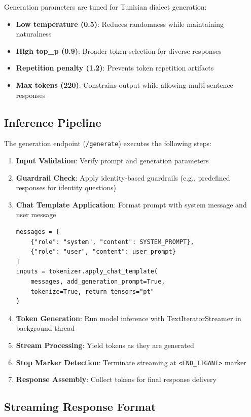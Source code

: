 \documentclass[12pt,a4paper]{report}
\begin{document}
Generation parameters are tuned for Tunisian dialect generation:
\begin{itemize}
    \item \textbf{Low temperature (0.5)}: Reduces randomness while maintaining naturalness
    \item \textbf{High top\_p (0.9)}: Broader token selection for diverse responses
    \item \textbf{Repetition penalty (1.2)}: Prevents token repetition artifacts
    \item \textbf{Max tokens (220)}: Constrains output while allowing multi-sentence responses
\end{itemize}

\subsection{Inference Pipeline}

The generation endpoint (\texttt{/generate}) executes the following steps:

\begin{enumerate}
    \item \textbf{Input Validation}: Verify prompt and generation parameters
    \item \textbf{Guardrail Check}: Apply identity-based guardrails (e.g., predefined responses for identity questions)
    \item \textbf{Chat Template Application}: Format prompt with system message and user message
    \begin{verbatim}
messages = [
    {"role": "system", "content": SYSTEM_PROMPT},
    {"role": "user", "content": user_prompt}
]
inputs = tokenizer.apply_chat_template(
    messages, add_generation_prompt=True, 
    tokenize=True, return_tensors="pt"
)
    \end{verbatim}
    \item \textbf{Token Generation}: Run model inference with TextIteratorStreamer in background thread
    \item \textbf{Stream Processing}: Yield tokens as they are generated
    \item \textbf{Stop Marker Detection}: Terminate streaming at \texttt{<END\_TIGANI>} marker
    \item \textbf{Response Assembly}: Collect tokens for final response delivery
\end{enumerate}

\subsection{Streaming Response Format}
\end{document}
